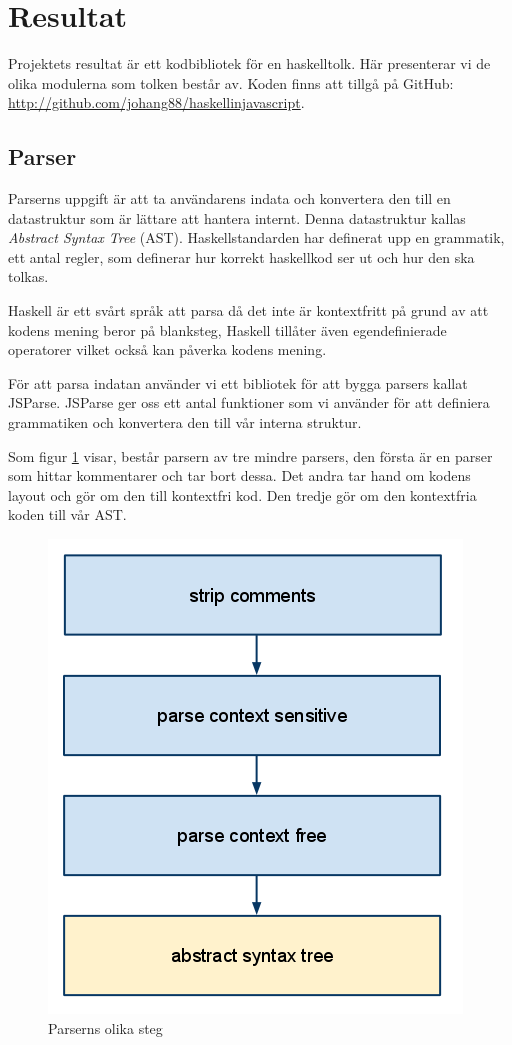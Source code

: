 \section{Resultat}

Projektets resultat är ett kodbibliotek för en haskelltolk. Här presenterar vi de olika modulerna som tolken består av. Koden finns att tillgå på GitHub: \url{http://github.com/johang88/haskellinjavascript}.

\subsection{Parser} 
Parserns uppgift är att ta användarens indata och konvertera den till en datastruktur 
som är lättare att hantera internt. Denna datastruktur kallas \emph{Abstract Syntax Tree} (AST). 
Haskellstandarden har definerat upp en grammatik, ett antal regler, som definerar hur korrekt haskellkod ser ut och hur den ska tolkas.

Haskell är ett svårt språk att parsa då det inte är kontextfritt på grund av att kodens mening beror på blanksteg, 
Haskell tillåter även egendefinierade operatorer vilket också kan påverka kodens mening. 

För att parsa indatan använder vi ett bibliotek för att bygga parsers kallat JSParse.
JSParse ger oss ett antal funktioner som vi använder för att definiera grammatiken och konvertera den till vår interna struktur.

Som figur \ref{fig:parser_steg} visar, består parsern av tre mindre parsers, den första är en parser som hittar kommentarer och tar bort dessa. 
Det andra tar hand om kodens layout och gör om den till kontextfri kod. Den tredje gör om den kontextfria koden till vår AST.

\begin{figure}[H]
    \begin{center}
        \includegraphics[width=.5\textwidth]{parser_1.png}
        \caption{Parserns olika steg}
        \label{fig:parser_steg} %
    \end{center}
\end{figure}

